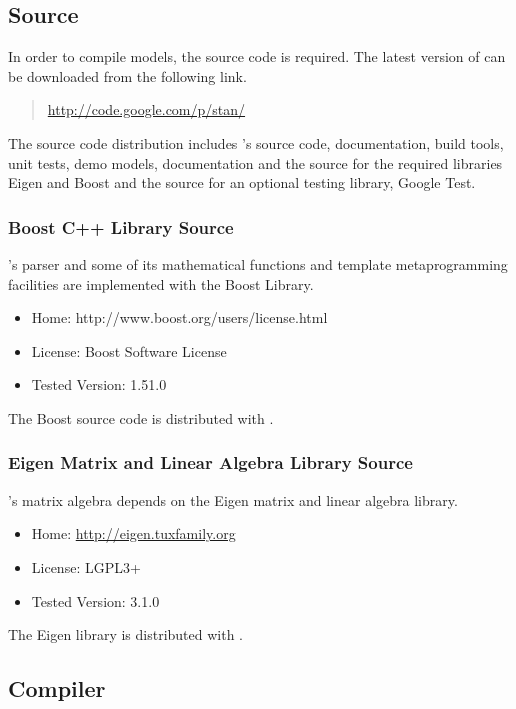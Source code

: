 \subsection{\Stan Source}

In order to compile \Stan models, the \Stan source code is required.
The latest version of \Stan can be downloaded from the following link.
%
\begin{quote}
\url{http://code.google.com/p/stan/}
\end{quote}
%
The \Stan source code distribution includes \Stan's source code,
documentation, build tools, unit tests, demo models, documentation and
the source for the required libraries Eigen and Boost and the source for
an optional testing library, Google Test.

\subsubsection{Boost C++ Library Source}

\Stan's parser and some of its mathematical functions and 
template metaprogramming facilities are implemented with the Boost
\Cpp Library.  
%
\begin{itemize}
\item Home: http://www.boost.org/users/license.html
\item License: Boost Software License
\item Tested Version: 1.51.0
\end{itemize}
%
The Boost source code is distributed with \Stan.


\subsubsection{Eigen Matrix and Linear Algebra Library Source}

\Stan's matrix algebra depends on the Eigen \Cpp matrix and linear
algebra library.  
%
\begin{itemize}
\item Home: \url{http://eigen.tuxfamily.org}
\item License: LGPL3+
\item Tested Version: 3.1.0
\end{itemize}
%
The Eigen library is distributed with \Stan.


\subsection{\Cpp Compiler}

